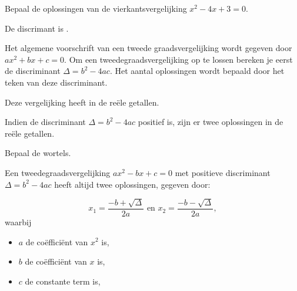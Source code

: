 \documentclass{ximera}
\begin{document}
\begin{exercise}

Bepaal de oplossingen van de vierkantsvergelijking \(x^2 - 4x + 3 = 0\).   

\begin{question}
De discrimant is \choicepositief. 

\begin{feedback}
    Het algemene voorschrift van een tweede graadsvergelijking wordt gegeven door  \(ax^2 + bx + c = 0\). 
    Om een tweedegraadsvergelijking op te lossen bereken je eerst de discriminant \(\Delta = b^2 - 4ac\). 
    Het aantal oplossingen wordt bepaald door het teken van deze discriminant. 
    
\end{feedback}
\end{question}

\begin{question}
    Deze vergelijking heeft \choicetwee in de reële getallen. 
    \begin{feedback}
        Indien de discriminant \(\Delta = b^2 - 4ac\) positief is, zijn er twee oplossingen in de reële getallen. 
    \end{feedback}
\end{question}

\begin{question}
    Bepaal de wortels. 
    
    \begin{hint}
        
        Een tweedegraadsvergelijking  \(ax^2 - bx + c = 0\) met positieve discriminant \( \Delta = b^2 - 4ac \) heeft altijd twee oplossingen, gegeven door: 
        
        \[
            x_{1} = \frac{-b + \sqrt{\Delta}}{2a}  \text{ en }  x_{2} = \frac{-b - \sqrt{\Delta}}{2a},
        \]
            waarbij
            \begin{itemize}
                \item \( a \) de coëfficiënt van \( x^2 \) is,
                \item \( b \) de coëfficiënt van \( x \) is,
                \item \( c \) de constante term is,
            \end{itemize}
            
    \end{hint}
    

\end{question}


\end{exercise}
\end{document}

